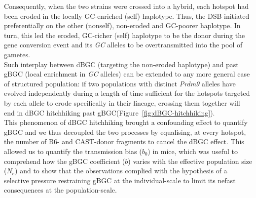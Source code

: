 Consequently, when the two strains were crossed into a hybrid, each hotspot had been eroded in the locally GC-enriched (self) haplotype.
Thus, the DSB initiated preferentially on the other (nonself), non-eroded and GC-poorer haplotype.
In turn, this led the eroded, GC-richer (self) haplotype to be the donor during the gene conversion event and its \textit{GC} alleles to be overtransmitted into the pool of gametes.\\

Such interplay between dBGC (targeting the non-eroded haplotype) and past gBGC (local enrichment in \textit{GC} alleles) can be extended to any more general case of structured population:
if two populations with distinct \textit{Prdm9} alleles have evolved independently during a length of time sufficient for the hotspots targeted by each allele to erode specifically in their lineage, crossing them together will end in dBGC hitchhiking past gBGC\@ (Figure~\ref{fig:dBGC-hitchhiking}).\\



%


This phenomenon of dBGC hitchhiking brought a confounding effect to quantify gBGC and we thus decoupled the two processes by equalising, at every hotspot, the number of B6- and CAST-donor fragments to cancel the dBGC effect.
This allowed us to quantify the transmission bias ($b_0$) in mice, which was useful to comprehend how the gBGC coefficient ($b$) varies with the effective population size ($N_e$) and to show that the observations complied with the hypothesis of a selective pressure restraining gBGC at the individual-scale to limit its nefast consequences at the population-scale.



